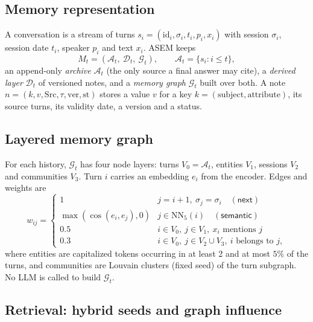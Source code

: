 \documentclass[10pt]{article}
\theoremstyle{plain}
\theoremstyle{definition}
\newcommand{\asem}{\textsc{ASEM}}
\newcommand{\A}{\mathcal{A}}
\newcommand{\D}{\mathcal{D}}
\newcommand{\G}{\mathcal{G}}
\begin{document}
\subsection{Memory representation}

A conversation is a stream of turns $s_i=(\mathrm{id}_i,\sigma_i,t_i,p_i,x_i)$ with session $\sigma_i$,
session date $t_i$, speaker $p_i$ and text $x_i$. \asem{} keeps
\begin{equation}
M_t=(\A_t,\ \D_t,\ \G_t),\qquad \A_t=\{s_i:i\le t\},
\label{eq:state}
\end{equation}
an append-only \emph{archive} $\A_t$ (the only source a final answer may cite), a \emph{derived layer}
$\D_t$ of versioned notes, and a \emph{memory graph} $\G_t$ built over both. A note
$n=(k,v,\mathrm{Src},\tau,\mathrm{ver},\mathrm{st})$ stores a value $v$ for a key
$k=(\text{subject},\text{attribute})$, its source turns, its validity date, a version and a status.

\subsection{Layered memory graph}
\label{sec:graph}

For each history, $\G_t$ has four node layers: turns $V_0=\A_t$, entities $V_1$, sessions $V_2$ and
communities $V_3$. Turn $i$ carries an embedding $e_i$ from the encoder. Edges and weights are
\begin{equation}
w_{ij}=\begin{cases}
1 & j=i+1,\ \sigma_j=\sigma_i \quad(\textsf{next})\\
\max(\cos(e_i,e_j),0) & j\in\mathrm{NN}_5(i)\quad(\textsf{semantic})\\
0.5 & i\in V_0,\ j\in V_1,\ \text{$x_i$ mentions $j$}\\
0.3 & i\in V_0,\ j\in V_2\cup V_3,\ \text{$i$ belongs to $j$},
\end{cases}
\label{eq:edges}
\end{equation}
where entities are capitalized tokens occurring in at least 2 and at most $5\%$ of the turns, and
communities are Louvain clusters (fixed seed) of the turn subgraph. No LLM is called to build $\G_t$.

\subsection{Retrieval: hybrid seeds and graph influence}
\end{document}
